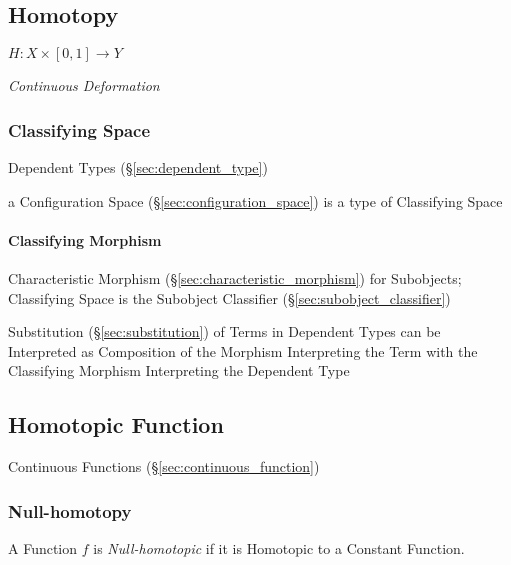 \subsection{Homotopy}\label{sec:homotopy}

$H : X \times [0,1] \rightarrow Y$

\emph{Continuous Deformation}



\subsubsection{Classifying Space}\label{sec:classifying_space}

Dependent Types (\S\ref{sec:dependent_type})

a Configuration Space (\S\ref{sec:configuration_space}) is a type of
Classifying Space



\paragraph{Classifying Morphism}\label{sec:classifying_morphism}\hfill

Characteristic Morphism (\S\ref{sec:characteristic_morphism}) for
Subobjects; Classifying Space is the Subobject Classifier
(\S\ref{sec:subobject_classifier})

Substitution (\S\ref{sec:substitution}) of Terms in Dependent Types
can be Interpreted as Composition of the Morphism Interpreting the
Term with the Classifying Morphism Interpreting the Dependent Type



\subsection{Homotopic Function}\label{sec:homotopic_function}

Continuous Functions (\S\ref{sec:continuous_function})



\subsubsection{Null-homotopy}\label{sec:null_homotopy}

A Function $f$ is \emph{Null-homotopic} if it is Homotopic to a
Constant Function.

